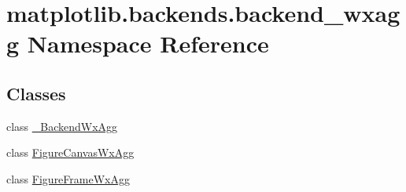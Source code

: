 \hypertarget{namespacematplotlib_1_1backends_1_1backend__wxagg}{}\section{matplotlib.\+backends.\+backend\+\_\+wxagg Namespace Reference}
\label{namespacematplotlib_1_1backends_1_1backend__wxagg}
\subsection*{Classes}
\begin{DoxyCompactItemize}
\item 
class \hyperlink{classmatplotlib_1_1backends_1_1backend__wxagg_1_1__BackendWxAgg}{\+\_\+\+Backend\+Wx\+Agg}
\item 
class \hyperlink{classmatplotlib_1_1backends_1_1backend__wxagg_1_1FigureCanvasWxAgg}{Figure\+Canvas\+Wx\+Agg}
\item 
class \hyperlink{classmatplotlib_1_1backends_1_1backend__wxagg_1_1FigureFrameWxAgg}{Figure\+Frame\+Wx\+Agg}
\end{DoxyCompactItemize}
